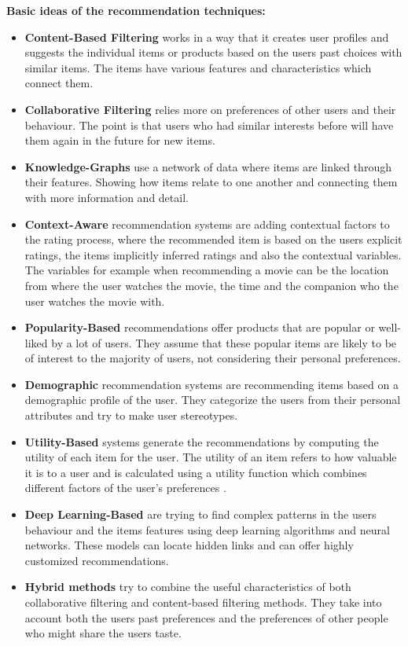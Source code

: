 \documentclass[\myFontSize,oneside,english,hidelinks,a4paper]{article}
\begin{document}
%
\textbf{Basic ideas of the recommendation techniques:}
\begin{itemize}[label=--]
\item \textbf{Content-Based Filtering} works in a way that it creates user profiles and suggests the individual items or products based on the users past choices with similar items. The items have various features and characteristics which connect them.
\item \textbf{Collaborative Filtering} relies more on preferences of other users and their behaviour. The point is that users who had similar interests before will have them again in the future for new items.
\item \textbf{Knowledge-Graphs} use a network of data where items are linked through their features. Showing how items relate to one another and connecting them with more information and detail.
\item \textbf{Context-Aware} recommendation systems are adding contextual factors to the rating process, where the recommended item is based on the users explicit ratings, the items implicitly inferred ratings and also the contextual variables. The variables for example when recommending a movie can be the location from where the user watches the movie, the time and the companion who the user watches the movie with.
\item \textbf{Popularity-Based} recommendations offer products that are popular or well-liked by a lot of users. They assume that these popular items are likely to be of interest to the majority of users, not considering their personal preferences.
\item \textbf{Demographic} recommendation systems are recommending items based on a demographic profile of the user. They categorize the users from their personal attributes and try to make user stereotypes.
\item \textbf{Utility-Based} systems generate the recommendations by computing the utility of each item for the user. The utility of an item refers to how valuable it is to a user and is calculated using a utility function which combines different factors of the user's preferences \cite{Burke2002331}.
\item \textbf{Deep Learning-Based} are trying to find complex patterns in the users behaviour and the items features using deep learning algorithms and neural networks. These models can locate hidden links and can offer highly customized recommendations.
\item \textbf{Hybrid methods} try to combine the useful characteristics of both collaborative filtering and content-based filtering methods. They take into account both the users past preferences and the preferences of other people who might share the users taste. \\
\end{itemize}
%
%
%
%
%
\newpage{}
\end{document}
